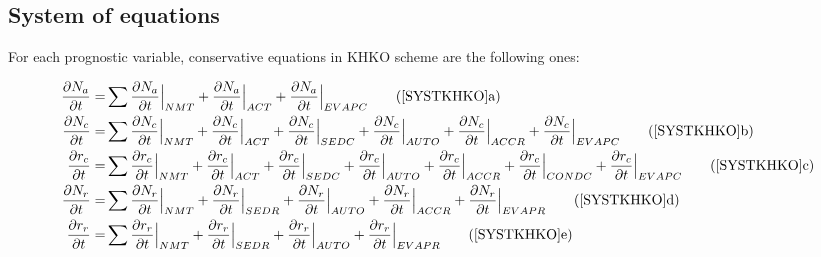 \subsection{System of equations}

For each prognostic variable, conservative equations in KHKO scheme are the following ones:


\begin{subequations} \label{SYSTKHKO}
\begin{align}
\frac{\displaystyle{\partial N_a}}{\displaystyle{\partial t}} =&
\sum \frac{\displaystyle{\partial N_a}}{\displaystyle{\partial t}} \Big|_{NMT}
+ \frac{\displaystyle{\partial N_a}}{\displaystyle{\partial t}} \Big|_{ACT}
+ \frac{\displaystyle{\partial N_a}}{\displaystyle{\partial t}} \Big|_{EVAPC} \tag{\ref{SYSTKHKO}a}\\
\frac{\displaystyle{\partial N_c}}{\displaystyle{\partial t}} =&
\sum \frac{\displaystyle{\partial N_c}}{\displaystyle{\partial t}} \Big|_{NMT}
+ \frac{\displaystyle{\partial N_c}}{\displaystyle{\partial t}} \Big|_{ACT} 
+ \frac{\displaystyle{\partial N_c}}{\displaystyle{\partial t}} \Big|_{SEDC} 
+ \frac{\displaystyle{\partial N_c}}{\displaystyle{\partial t}} \Big|_{AUTO} 
+ \frac{\displaystyle{\partial N_c}}{\displaystyle{\partial t}} \Big|_{ACCR}
+ \frac{\displaystyle{\partial N_c}}{\displaystyle{\partial t}} \Big|_{EVAPC}  \tag{\ref{SYSTKHKO}b}\\
\frac{\displaystyle{\partial r_c}}{\displaystyle{\partial t}} =&
\sum \frac{\displaystyle{\partial r_c}}{\displaystyle{\partial t}} \Big|_{NMT}
+ \frac{\displaystyle{\partial r_c}}{\displaystyle{\partial t}} \Big|_{ACT} 
+ \frac{\displaystyle{\partial r_c}}{\displaystyle{\partial t}} \Big|_{SEDC} 
+ \frac{\displaystyle{\partial r_c}}{\displaystyle{\partial t}} \Big|_{AUTO} 
+ \frac{\displaystyle{\partial r_c}}{\displaystyle{\partial t}} \Big|_{ACCR}
+ \frac{\displaystyle{\partial r_c}}{\displaystyle{\partial t}} \Big|_{CONDC}
+ \frac{\displaystyle{\partial r_c}}{\displaystyle{\partial t}} \Big|_{EVAPC} \tag{\ref{SYSTKHKO}c}\\
\frac{\displaystyle{\partial N_r}}{\displaystyle{\partial t}} =&
\sum \frac{\displaystyle{\partial N_r}}{\displaystyle{\partial t}} \Big|_{NMT}
+ \frac{\displaystyle{\partial N_r}}{\displaystyle{\partial t}} \Big|_{SEDR} 
+ \frac{\displaystyle{\partial N_r}}{\displaystyle{\partial t}} \Big|_{AUTO} 
+ \frac{\displaystyle{\partial N_r}}{\displaystyle{\partial t}} \Big|_{ACCR}
+ \frac{\displaystyle{\partial N_r}}{\displaystyle{\partial t}} \Big|_{EVAPR}   \tag{\ref{SYSTKHKO}d}\\
\frac{\displaystyle{\partial r_r}}{\displaystyle{\partial t}} =&
\sum \frac{\displaystyle{\partial r_r}}{\displaystyle{\partial t}} \Big|_{NMT}
+ \frac{\displaystyle{\partial r_r}}{\displaystyle{\partial t}} \Big|_{SEDR} 
+ \frac{\displaystyle{\partial r_r}}{\displaystyle{\partial t}} \Big|_{AUTO} 
+ \frac{\displaystyle{\partial r_r}}{\displaystyle{\partial t}} \Big|_{EVAPR} \tag{\ref{SYSTKHKO}e}
\end{align}
\end{subequations}
\addtocounter{equation}{1}



